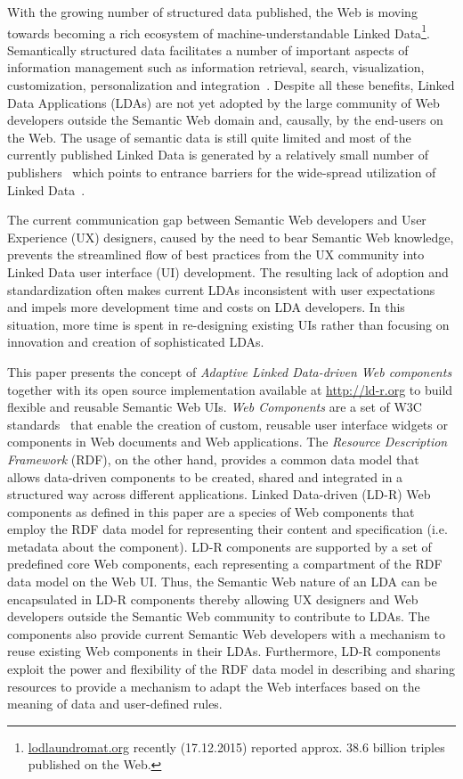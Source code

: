 \documentclass{llncs}
\begin{document}
With the growing number of structured data published, the Web is moving towards becoming a rich ecosystem of machine-understandable Linked Data\footnote{\url{lodlaundromat.org} recently (17.12.2015) reported approx. 38.6 billion triples published on the Web.}.
Semantically structured data facilitates a number of important aspects of
information management such as information retrieval, search, visualization, customization, personalization and integration~\cite{SCAJ-Khalili-2013}.
Despite all these benefits, Linked Data Applications (LDAs) are not yet adopted by the large community of Web developers outside the Semantic Web domain and, causally, by the end-users on the Web.
The usage of semantic data is still quite limited and most of the currently published Linked Data is generated by a relatively small number of publishers~\cite{ontowiki-swj} which points to entrance barriers for the wide-spread utilization of Linked Data~\cite{Benson2014}.

The current communication gap between Semantic Web developers and User Experience (UX) designers, caused by the need to bear Semantic Web knowledge, prevents the streamlined flow of best practices from the UX community into Linked Data user interface (UI) development.
The resulting lack of adoption and standardization often makes current LDAs inconsistent with user expectations and impels more development time and costs on LDA developers.
In this situation, more time is spent in re-designing existing UIs rather than focusing on innovation and creation of sophisticated LDAs.

This paper presents the concept of \emph{Adaptive Linked Data-driven Web components} together with its open source implementation available at \url{http://ld-r.org} to build flexible and reusable Semantic Web UIs.
\emph{Web Components} are a set of W3C standards~\cite{webcomponentsW3C} that enable the creation of custom, reusable user interface widgets or components in Web documents and Web applications.
The \emph{Resource Description Framework} (RDF), on the other hand, provides a common data model that allows data-driven components to be created, shared and integrated in a structured way across different applications.
Linked Data-driven (LD-R) Web components as defined in this paper are a species of Web components that employ the RDF data model for representing their content and specification (i.e. metadata about the component).
LD-R components are supported by a set of predefined core Web components, each representing a compartment of the RDF data model on the Web UI.
Thus, the Semantic Web nature of an LDA can be encapsulated in LD-R components thereby allowing UX designers and Web developers outside the Semantic Web community to contribute to LDAs.
The components also provide current Semantic Web developers with a mechanism to reuse existing Web components in their LDAs.
Furthermore, LD-R components exploit the power and flexibility of the RDF data model in describing and sharing resources to provide a mechanism to adapt the Web interfaces based on the meaning of data and user-defined rules.
\end{document}
